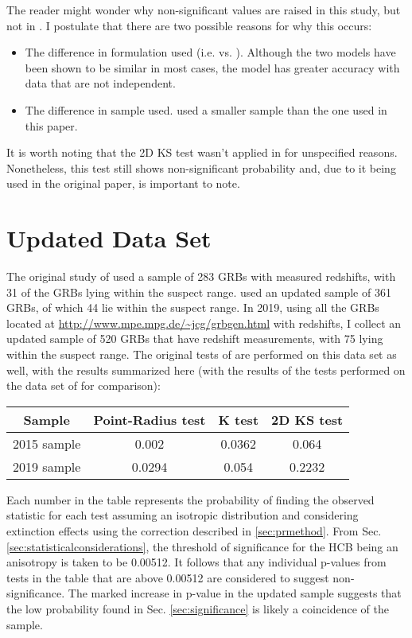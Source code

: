 \documentclass[fleqn,usenatbib]{mnras}
\begin{document}
The reader might wonder why non-significant values are raised in this study, but not in \citet{horvath2014}. I postulate that there are two possible reasons for why this occurs:
\begin{itemize}
    \item The difference in formulation used (i.e. \citet{fasano1987} vs. \citet{peacock1983}). Although the two models have been shown to be similar in most cases, the \citet{fasano1987} model has greater accuracy with data that are not independent.
    \item The difference in sample used. \citet{horvath2014} used a smaller sample than the one used in this paper.
\end{itemize}

It is worth noting that the 2D KS test wasn't applied in \citet{horvath2015} for unspecified reasons. Nonetheless, this test still shows non-significant probability and, due to it being used in the original paper, is important to note.

\section{Updated Data Set}
\label{sec:updated}
The original study of \citet{horvath2014} used a sample of 283 GRBs with measured redshifts, with 31 of the GRBs lying within the suspect range. \citet{horvath2015} used an updated sample of 361 GRBs, of which 44 lie within the suspect range. In 2019, using all the GRBs located at \url{http://www.mpe.mpg.de/~jcg/grbgen.html} with redshifts, I collect an updated sample of 520 GRBs that have redshift measurements, with 75 lying within the suspect range.
The original tests of \citet{horvath2014} are performed on this data set as well, with the results summarized here (with the results of the tests performed on the data set of \citet{horvath2015} for comparison):
\begin{center}
 \begin{tabular}{||c c c c||} 
 \hline
 Sample & Point-Radius test & K test & 2D KS test \\ [0.5ex] 
 \hline\hline
 2015 sample & 0.002 & 0.0362 & 0.064 \\ 
 \hline
 2019 sample & 0.0294 & 0.054 & 0.2232 \\
 \hline
\end{tabular}
\end{center}

Each number in the table represents the probability of finding the observed statistic for each test assuming an isotropic distribution and considering extinction effects using the correction described in \ref{sec:prmethod}. From Sec. \ref{sec:statisticalconsiderations}, the threshold of significance for the HCB being an anisotropy is taken to be 0.00512. It follows that any individual p-values from tests in the table that are above 0.00512 are considered to suggest non-significance. The marked increase in p-value in the updated sample suggests that the low probability found in Sec. \ref{sec:significance} is likely a coincidence of the sample.
\end{document}

